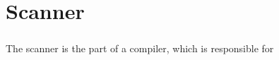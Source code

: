 \chapter{Scanner}
\label{chapter:scanner}
\paragraph{}
  The scanner is the part of a compiler, which is responsible for 